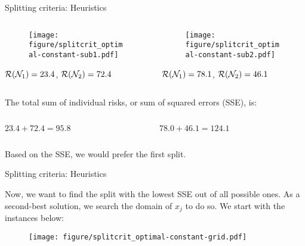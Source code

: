 \documentclass[11pt,compress,t,notes=noshow, xcolor=table]{beamer}
\begin{document}
\begin{vbframe}{Splitting criteria: Heuristics}

\begin{columns}
\begin{column}{0.5\textwidth}


\begin{figure}
\texttt{[image: figure/splitcrit\_optimal-constant-sub1.pdf]} 
\end{figure}

$\mathcal{R}(\mathcal{N}_1) = 23.4$, $\mathcal{R}(\mathcal{N}_2) = 72.4$ 
 
\end{column}
\begin{column}{0.5\textwidth}

\begin{figure}
\texttt{[image: figure/splitcrit\_optimal-constant-sub2.pdf]} 
\end{figure}

$\mathcal{R}(\mathcal{N}_1) = 78.1$, $\mathcal{R}(\mathcal{N}_2) = 46.1$

\end{column}
\end{columns}
\vspace{0.1in}

The total sum of individual risks, or sum of squared errors (SSE), is:
\vspace{0.1in}

\begin{columns}
\begin{column}{0.5\textwidth}
$23.4 + 72.4 = 95.8$
\end{column}

\begin{column}{0.5\textwidth}
$78.0 + 46.1 = 124.1$ 
\end{column}
\end{columns}

\vspace{0.1in}
Based on the SSE, we would prefer the first split.

\end{vbframe}

\begin{vbframe}{Splitting criteria: Heuristics}

Now, we want to find the split with the lowest SSE out of all possible ones.
As a second-best solution, we search the domain of $x_j$ to do so.
We start with the instances below:

\begin{figure}
\texttt{[image: figure/splitcrit\_optimal-constant-grid.pdf]} 
\end{figure}


\end{vbframe}
\end{document}
